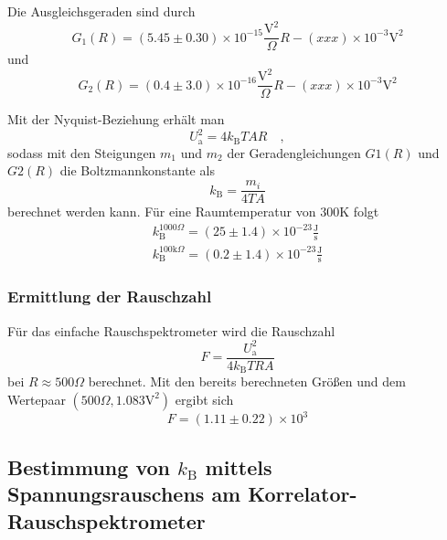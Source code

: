 		Die Ausgleichsgeraden sind durch
		\begin{equation}
			G_1(R) = (5.45 \pm 0.30) \times 10^{-15} \frac{\text{V}^2}{\Omega} R 
					- (xxx)\times 10^{-3}\text{V}^2 		
		\end{equation}
		und
		\begin{equation}
			G_2(R) = (0.4 \pm 3.0) \times 10^{-16} \frac{\text{V}^2}{\Omega} R 
					- (xxx)\times 10^{-3}\text{V}^2 		
		\end{equation}
		
		Mit der Nyquist-Beziehung erhält man
		\begin{equation}
			U_\text{a}^2 =4k_\text{B}T A R \quad , 
		\end{equation}
		sodass mit den Steigungen $m_1$ und $m_2$ der Geradengleichungen $G1(R)$ und $G2(R)$ 
		die Boltzmannkonstante als
		\begin{equation}
		k_\text{B}=\frac{m_i}{4 T A}
		\end{equation}
		berechnet werden kann. Für eine Raumtemperatur von $300$K folgt
		\begin{align}
		k_\text{B}^{1000\Omega}			=  (25\pm 1.4)\times 10^{-23} \frac{\text{J}}{\text{s}} \\
		k_\text{B}^{100\text{k}\Omega}	=	(0.2\pm 1.4)\times 10^{-23} \frac{\text{J}}{\text{s}}  
		\end{align}
	
	\subsubsection{Ermittlung der Rauschzahl}
		Für das einfache Rauschspektrometer wird die Rauschzahl 
		\begin{equation}
			F = \frac{U_\text{a}^2}{4 k_\text{B}T R A}
		\end{equation}
		bei $R\approx 500\Omega$ berechnet. Mit den bereits berechneten Größen und 
		dem Wertepaar $(500\Omega,1.083 \text{V}^2)$ ergibt sich 
		\begin{equation}
			F = (1.11 \pm 0.22) \times 10^{3}%
		\end{equation}
		
		
		
		
		
		
		
\subsection{Bestimmung von $k_\text{B}$ mittels Spannungsrauschens am 
			Korrelator-Rauschspektrometer}
			
